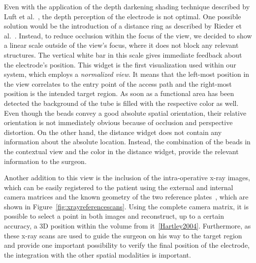 \documentclass{vgtc}                          %
\begin{document}
Even with the application of the depth darkening shading technique described by Luft et al.~\cite{Luft2005}, the depth perception of the electrode is not optimal. One possible solution would be the introduction of a distance ring as described by Rieder et al.~\cite{Rieder2008}. Instead, to reduce occlusion within the focus of the view, we decided to show a linear scale outside of the view's focus, where it does not block any relevant structures. The vertical white bar in this scale gives immediate feedback about the electrode's position. This widget is the first visualization used within our system, which employs a \emph{normalized view}. It means that the left-most position in the view correlates to the entry point of the access path and the right-most position is the intended target region. As soon as a functional area has been detected the background of the tube is filled with the respective color as well. Even though the beads convey a good absolute spatial orientation, their relative orientation is not immediately obvious because of occlusion and perspective distortion. On the other hand, the distance widget does not contain any information about the absolute location. Instead, the combination of the beads in the contextual view and the color in the distance widget, provide the relevant information to the surgeon.

Another addition to this view is the inclusion of the intra-operative x-ray images, which can be easily registered to the patient using the external and internal camera matrices and the known geometry of the two reference plates~\cite{Caprile1990,Zheng2008}, which are shown in Figure~\ref{fig:xrayreferencescans}. Using the complete camera matrix, it is possible to select a point in both images and reconstruct, up to a certain accuracy, a 3D position within the volume from it~\ref{Hartley2004}. Furthermore, as these x-ray scans are used to guide the surgeon on his way to the target region and provide one important possibility to verify the final position of the electrode, the integration with the other spatial modalities is important.
\end{document}

